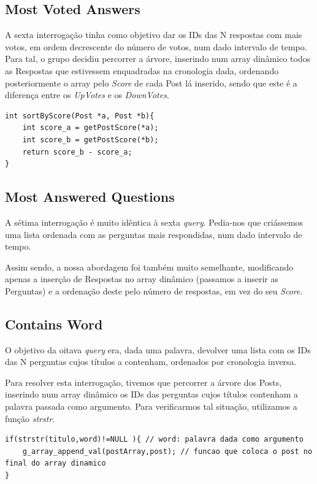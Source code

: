 \documentclass[a4paper, 11pt, oneside]{article}
\begin{document}
\subsection{Most Voted Answers}
A sexta interrogação tinha como objetivo dar os IDs das N respostas com mais votos, em ordem decrescente do número de votos, num dado intervalo de tempo. Para tal, o grupo decidiu percorrer a árvore, inserindo num array dinâmico todos as Respostas que estivessem enquadradas na cronologia dada, ordenando posteriormente o array pelo \textit{Score} de cada Post lá inserido, sendo que este é a diferença entre os \textit{UpVotes} e os \textit{DownVotes}.
\begin{lstlisting}[caption=Query 6 - função de ordenação]
int sortByScore(Post *a, Post *b){
	int score_a = getPostScore(*a);
	int score_b = getPostScore(*b);
	return score_b - score_a;
}
\end{lstlisting}


\subsection{Most Answered Questions}
A sétima interrogação é muito idêntica à sexta \textit{query}. Pedia-nos que criássemos uma lista ordenada com as perguntas mais respondidas, num dado intervalo de tempo.

Assim sendo, a nossa abordagem foi também muito semelhante, modificando apenas a inserção de Respostas no array dinâmico (passamos a inserir as Perguntas) e a ordenação deste pelo número de respostas, em vez do seu \textit{Score}.

\subsection{Contains Word}
O objetivo da oitava \textit{query} era, dada uma palavra, devolver uma lista com os IDs das N perguntas cujos títulos a contenham, ordenados por cronologia inversa.

Para resolver esta interrogação, tivemos que percorrer a árvore dos Posts, inserindo num array dinâmico os IDs das perguntas cujos títulos contenham a palavra passada como argumento. Para verificarmos tal situação, utilizamos a função \textit{strstr}. 

\begin{lstlisting}[caption=Query 8 - comparação do título e da palavra dada como argumento]
if(strstr(titulo,word)!=NULL ){ // word: palavra dada como argumento
	g_array_append_val(postArray,post); // funcao que coloca o post no final do array dinamico
}
\end{lstlisting}
\end{document}
